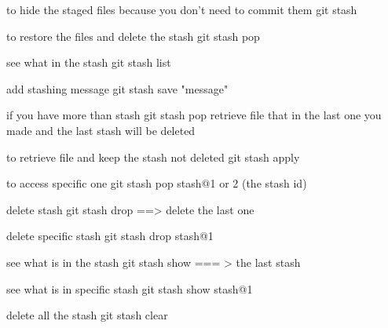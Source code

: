 to hide the staged files  because you don't need to commit them 
  git stash 

to restore the files and delete the stash  
  git stash pop 


see what in the stash 
  git stash list  

add stashing message 
  git stash save "message"

if you have more than stash 
  git stash pop    retrieve file that in the last one you made
  and the last stash will be deleted 

to retrieve file and keep the stash not deleted
  git stash apply 


to access specific one  
  git stash pop stash@{1 or 2 (the stash id)} 

delete stash 
  git stash drop    ==>  delete the last one 

delete specific stash 
  git stash drop stash@{1}

see what is in the stash 
  git stash show     === > the last stash 

see what is in specific stash 
  git stash show stash@{1}

delete all the stash 
  git stash clear 

  